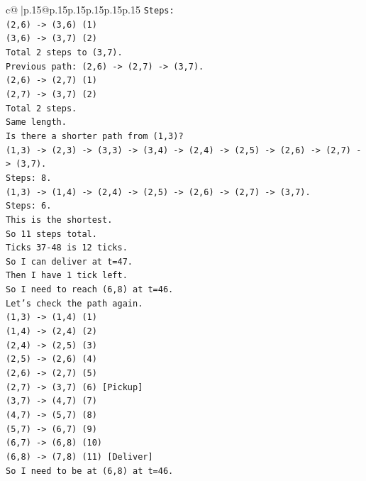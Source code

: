 \documentclass{article}
\begin{document}
{\begin{supertabular}{c@{$\;$}|p{.15\linewidth}@{}p{.15\linewidth}p{.15\linewidth}p{.15\linewidth}p{.15\linewidth}p{.15\linewidth}}
{{{\texttt{Steps:} \\
\texttt{(2,6) {-}> (3,6) (1)} \\
\texttt{(3,6) {-}> (3,7) (2)} \\
\texttt{Total 2 steps to (3,7).} \\
\texttt{Previous path: (2,6) {-}> (2,7) {-}> (3,7).} \\
\texttt{(2,6) {-}> (2,7) (1)} \\
\texttt{(2,7) {-}> (3,7) (2)} \\
\texttt{Total 2 steps.} \\
\texttt{Same length.} \\
\texttt{Is there a shorter path from (1,3)?} \\
\texttt{(1,3) {-}> (2,3) {-}> (3,3) {-}> (3,4) {-}> (2,4) {-}> (2,5) {-}> (2,6) {-}> (2,7) {-}> (3,7).} \\
\texttt{Steps: 8.} \\
\texttt{(1,3) {-}> (1,4) {-}> (2,4) {-}> (2,5) {-}> (2,6) {-}> (2,7) {-}> (3,7).} \\
\texttt{Steps: 6.} \\
\texttt{This is the shortest.} \\
\texttt{So 11 steps total.} \\
\texttt{Ticks 37{-}48 is 12 ticks.} \\
\texttt{So I can deliver at t=47.} \\
\texttt{Then I have 1 tick left.} \\
\texttt{So I need to reach (6,8) at t=46.} \\
\texttt{Let's check the path again.} \\
\texttt{(1,3) {-}> (1,4) (1)} \\
\texttt{(1,4) {-}> (2,4) (2)} \\
\texttt{(2,4) {-}> (2,5) (3)} \\
\texttt{(2,5) {-}> (2,6) (4)} \\
\texttt{(2,6) {-}> (2,7) (5)} \\
\texttt{(2,7) {-}> (3,7) (6) {[}Pickup{]}} \\
\texttt{(3,7) {-}> (4,7) (7)} \\
\texttt{(4,7) {-}> (5,7) (8)} \\
\texttt{(5,7) {-}> (6,7) (9)} \\
\texttt{(6,7) {-}> (6,8) (10)} \\
\texttt{(6,8) {-}> (7,8) (11) {[}Deliver{]}} \\
\texttt{So I need to be at (6,8) at t=46.} \\
}}}
\end{supertabular}}
\end{document}
